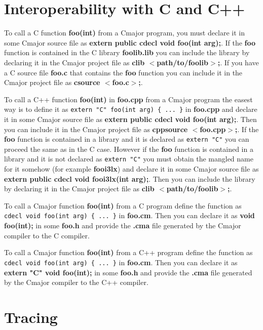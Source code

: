 \documentclass[oneside, a4paper, 11pt]{article}
\begin{document}
\section{Interoperability with C and C++}

To call a C function \textbf{foo(int)} from a Cmajor program, you must declare it in some Cmajor source file as
\textbf{extern public cdecl void foo(int arg);}.
If the \textbf{foo} function is contained in the C library \textbf{foolib.lib} you can
include the library by declaring it in the Cmajor project file as \textbf{clib $<$path/to/foolib$>$;}.
If you have a C source file \textbf{foo.c} that contains the \textbf{foo} function
you can include it in the Cmajor project file as \textbf{csource $<$foo.c$>$;}.

To call a C++ function \textbf{foo(int)} in \textbf{foo.cpp} from a Cmajor program the easest way is to define it
as \verb|extern "C" foo(int arg) { ... }| in \textbf{foo.cpp} and declare it in some Cmajor source file as
\textbf{extern public cdecl void foo(int arg);}. Then you can include it in the Cmajor project file as
\textbf{cppsource $<$foo.cpp$>$;}.
If the \textbf{foo} function is contained in a library and it is declared as \verb|extern "C"| you can proceed the same as in the C case.
However if the \textbf{foo} function is contained in a library and it is not declared as \verb|extern "C"| you
must obtain the mangled name for it somehow (for example \textbf{fooi3lx}) and declare it in some Cmajor source file as
\textbf{extern public cdecl void fooi3lx(int arg);}.
Then you can include the library by declaring it in the Cmajor project file as \textbf{clib $<$path/to/foolib$>$;}.

To call a Cmajor function \textbf{foo(int)} from a C program define the function as\\
\verb|cdecl void foo(int arg) { ... }| in \textbf{foo.cm}. Then you can declare it as
\textbf{void foo(int);} in some \textbf{foo.h} and
provide the \textbf{.cma} file generated by the Cmajor compiler to the C compiler.

To call a Cmajor function \textbf{foo(int)} from a C++ program define the function as\\
\verb|cdecl void foo(int arg) { ... }| in \textbf{foo.cm}. Then you can declare it as
\textbf{extern "C" void foo(int);} in some \textbf{foo.h} and
provide the \textbf{.cma} file generated by the Cmajor compiler to the C++ compiler.

\section{Tracing}
\end{document}
